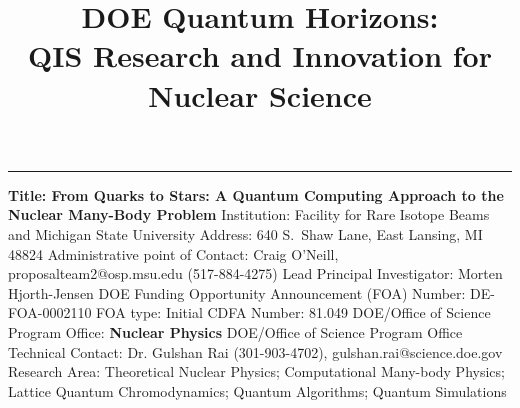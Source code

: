\documentclass[11pt]{article}
\begin{document}
\title{DOE Quantum Horizons: \\ QIS Research and Innovation for Nuclear Science}
\maketitle
\begin{flushleft}
\rule{\linewidth}{1mm}
{\bf Title: From Quarks to Stars: A Quantum Computing Approach to the Nuclear Many-Body Problem}\newline
Institution: Facility for Rare Isotope Beams and Michigan State University\newline
Address: 640 S.~Shaw Lane, East Lansing, MI 48824\newline
Administrative point of Contact: Craig O'Neill, proposalteam2@osp.msu.edu (517-884-4275) \newline
Lead Principal Investigator: Morten Hjorth-Jensen\newline
DOE Funding Opportunity Announcement (FOA) Number: DE-FOA-0002110\newline
FOA type: Initial\newline
CDFA Number: 81.049\newline
DOE/Office of Science Program Office: {\bf Nuclear Physics}\newline
DOE/Office of Science Program Office Technical Contact: Dr. Gulshan Rai (301-903-4702), gulshan.rai@science.doe.gov\newline
Research Area: Theoretical Nuclear Physics; Computational Many-body Physics; Lattice Quantum Chromodynamics; Quantum Algorithms; Quantum Simulations
\end{flushleft}
\end{document}
